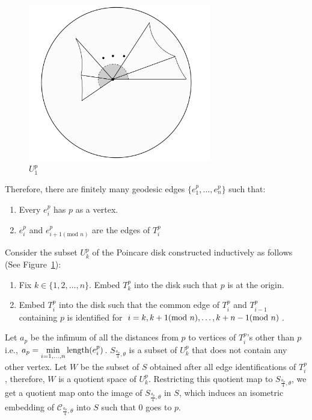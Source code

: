 \begin{figure}[h]
%	
%	

	\includegraphics[width=8cm]{Chapter1/conenbhd.pdf}
	\caption{$U_1^p$}
	\label{fig:conenbhd}
\end{figure}

Therefore, there are finitely many geodesic edges $\{e_1^p,\ldots,e_n^p\}$ such that:
\begin{enumerate}
	\item Every $e_i^p$ has $p$ as a vertex.
	\item $e_i^p$ and $e_{{i+1}(\text{mod } n)}^p$ are the edges of $T_i^p$
\end{enumerate}

\noindent Consider the subset $U_k^p$ of the Poincare disk constructed inductively as follows (See Figure~\ref{fig:conenbhd}):
\begin{enumerate}
	\item Fix $k \in \{1,2,\ldots,n\}$. Embed $T_k^p$ into the disk such that $p$ is at the origin.
	\item Embed $T_i^p$ into the disk such that the common edge of $T_i^p$ and $T_{i-1}^p$ containing $p$ is identified for $i = k, k+1(\textup{mod } n), \ldots, k+n-1(\textup{mod } n)$.
\end{enumerate}

Let $a_p$ be the infimum of all the distances from $p$ to vertices of $T_i^p$'s other than $p$ i.e., $a_p = \displaystyle \min_{i=1,\ldots, n} \textup{length}(e_i^p)$. $S_{\frac{a_p}{4}, \theta}$ is a subset of $U_k^p$ that does not contain any other vertex. Let $W$ be the subset of $S$ obtained after all edge identifications of $T_i^p$, therefore, $W$ is a quotient space of $U_k^p$. Restricting this quotient map to $S_{\frac{a_p}{4}, \theta}$, we get a quotient map onto the image of $S_{\frac{a_p}{4}, \theta}$ in $S$, which induces an isometric embedding of $\mathcal{C}_{\frac{a_p}{4}, \theta}$ into $S$ such that $0$ goes to $p$.


